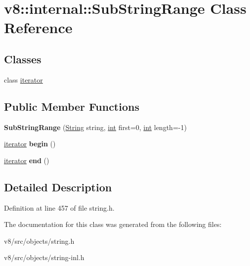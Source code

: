 \hypertarget{classv8_1_1internal_1_1SubStringRange}{}\section{v8\+:\+:internal\+:\+:Sub\+String\+Range Class Reference}
\label{classv8_1_1internal_1_1SubStringRange}
\subsection*{Classes}
\begin{DoxyCompactItemize}
\item 
class \mbox{\hyperlink{classv8_1_1internal_1_1SubStringRange_1_1iterator}{iterator}}
\end{DoxyCompactItemize}
\subsection*{Public Member Functions}
\begin{DoxyCompactItemize}
\item 
\mbox{\label{classv8_1_1internal_1_1SubStringRange_aa99bf729ea21b20cda2cc18efa334e7b}} 
{\bfseries Sub\+String\+Range} (\mbox{\hyperlink{classv8_1_1internal_1_1String}{String}} string, \mbox{\hyperlink{classint}{int}} first=0, \mbox{\hyperlink{classint}{int}} length=-\/1)
\item 
\mbox{\label{classv8_1_1internal_1_1SubStringRange_a806cf128334b5237266097a94ae0f9f6}} 
\mbox{\hyperlink{classv8_1_1internal_1_1SubStringRange_1_1iterator}{iterator}} {\bfseries begin} ()
\item 
\mbox{\label{classv8_1_1internal_1_1SubStringRange_ad6f14aab3ed81ce978ff66110af2ebed}} 
\mbox{\hyperlink{classv8_1_1internal_1_1SubStringRange_1_1iterator}{iterator}} {\bfseries end} ()
\end{DoxyCompactItemize}


\subsection{Detailed Description}


Definition at line 457 of file string.\+h.



The documentation for this class was generated from the following files\+:\begin{DoxyCompactItemize}
\item 
v8/src/objects/string.\+h\item 
v8/src/objects/string-\/inl.\+h\end{DoxyCompactItemize}
